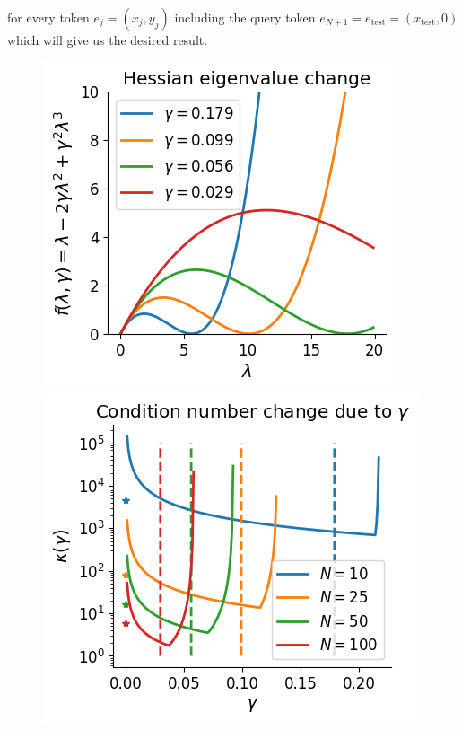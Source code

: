 \documentclass{article}
\theoremstyle{plain}
\theoremstyle{definition}
\theoremstyle{remark}
\begin{document}
for every token $e_j = (x_j, y_j)$ including the query token $e_{N+1} = e_{\text{test}} = (x_{\text{test}}, 0) $ which will give us the desired result.

\begin{figure}
\begin{center}
\begin{minipage}{.32\textwidth}
 \centering
  \begin{center}
    \includegraphics[width=.9\textwidth]{Final_figures/gd_plusplus/gd_pp.png}
  \end{center}
\end{minipage}
\begin{minipage}{.32\textwidth}
  \centering
  \begin{center}
    \includegraphics[width=.9\textwidth]{Final_figures/gd_plusplus/gd_pp_kappa.png}

\end{center}
\end{minipage}
\end{center}
\end{figure}
\end{document}
